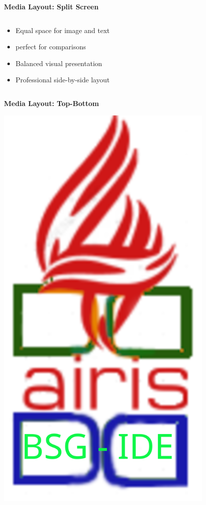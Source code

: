 \documentclass[aspectratio=169]{beamer}
\begin{document}
\begin{frame}{\Large\textbf{Media Layout: Split Screen}}
\begin{columns}[T]
        \begin{column}{0.48\textwidth}
            \begin{itemize}
                \item Equal space for image and text
        \item {} perfect for comparisons
        \item Balanced visual presentation
        \item Professional side-by-side layout
            \end{itemize}
        \end{column}
    \end{columns}
\end{frame}

\begin{frame}{\Large\textbf{Media Layout: Top-Bottom}}
    \vspace{-0.5em}
    \begin{center}
        \includegraphics[width=0.8\textwidth,height=0.45\textheight,keepaspectratio]{bsg-ide.png}

\end{center}
\end{frame}
\end{document}
